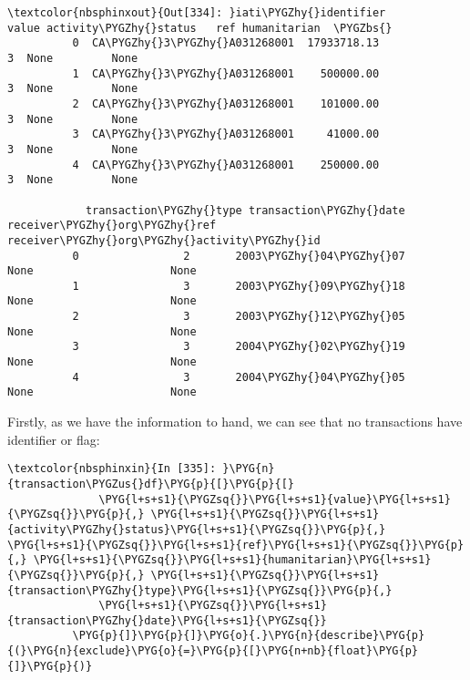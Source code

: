 \documentclass[letterpaper,10pt,english]{sphinxmanual}
\begin{document}
\begin{Verbatim}[commandchars=\\\{\}]
\textcolor{nbsphinxout}{Out[334]: }iati\PYGZhy{}identifier        value activity\PYGZhy{}status   ref humanitarian  \PYGZbs{}
          0  CA\PYGZhy{}3\PYGZhy{}A031268001  17933718.13               3  None         None
          1  CA\PYGZhy{}3\PYGZhy{}A031268001    500000.00               3  None         None
          2  CA\PYGZhy{}3\PYGZhy{}A031268001    101000.00               3  None         None
          3  CA\PYGZhy{}3\PYGZhy{}A031268001     41000.00               3  None         None
          4  CA\PYGZhy{}3\PYGZhy{}A031268001    250000.00               3  None         None
          
            transaction\PYGZhy{}type transaction\PYGZhy{}date receiver\PYGZhy{}org\PYGZhy{}ref receiver\PYGZhy{}org\PYGZhy{}activity\PYGZhy{}id
          0                2       2003\PYGZhy{}04\PYGZhy{}07             None                     None
          1                3       2003\PYGZhy{}09\PYGZhy{}18             None                     None
          2                3       2003\PYGZhy{}12\PYGZhy{}05             None                     None
          3                3       2004\PYGZhy{}02\PYGZhy{}19             None                     None
          4                3       2004\PYGZhy{}04\PYGZhy{}05             None                     None
\end{Verbatim}

Firstly, as we have the information to hand, we can see that no
transactions have  identifier or  flag:

\begin{Verbatim}[commandchars=\\\{\}]
\textcolor{nbsphinxin}{In [335]: }\PYG{n}{transaction\PYGZus{}df}\PYG{p}{[}\PYG{p}{[}
              \PYG{l+s+s1}{\PYGZsq{}}\PYG{l+s+s1}{value}\PYG{l+s+s1}{\PYGZsq{}}\PYG{p}{,} \PYG{l+s+s1}{\PYGZsq{}}\PYG{l+s+s1}{activity\PYGZhy{}status}\PYG{l+s+s1}{\PYGZsq{}}\PYG{p}{,} \PYG{l+s+s1}{\PYGZsq{}}\PYG{l+s+s1}{ref}\PYG{l+s+s1}{\PYGZsq{}}\PYG{p}{,} \PYG{l+s+s1}{\PYGZsq{}}\PYG{l+s+s1}{humanitarian}\PYG{l+s+s1}{\PYGZsq{}}\PYG{p}{,} \PYG{l+s+s1}{\PYGZsq{}}\PYG{l+s+s1}{transaction\PYGZhy{}type}\PYG{l+s+s1}{\PYGZsq{}}\PYG{p}{,}
              \PYG{l+s+s1}{\PYGZsq{}}\PYG{l+s+s1}{transaction\PYGZhy{}date}\PYG{l+s+s1}{\PYGZsq{}}
          \PYG{p}{]}\PYG{p}{]}\PYG{o}{.}\PYG{n}{describe}\PYG{p}{(}\PYG{n}{exclude}\PYG{o}{=}\PYG{p}{[}\PYG{n+nb}{float}\PYG{p}{]}\PYG{p}{)}
\end{Verbatim}
\end{document}
